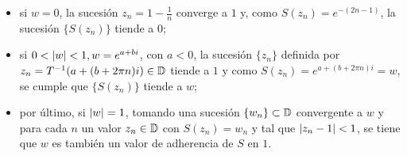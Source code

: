 \begin{itemize}
    \item si $w = 0$, la sucesión $z_n = 1 - \frac{1}{n}$ converge a $1$ y, como $S(z_n) = e^{-(2n-1)}$, la sucesión $\{S(z_n)\}$ tiende a 0;

    \item si $0 < \left\lvert w\right\rvert < 1, w = e^{a+bi}$, con $a < 0$, la sucesión $\{z_n\}$ definida por $z_n = T^{-1}(a + (b+2 \pi n)i) \in \mathbb{D}$ tiende a $1$ y como $S(z_n) = e^{a+(b+ 2 \pi n)i} = w$, se cumple que $\{S(z_n)\}$ tiende a $w$;

    \item por último, si $\left\lvert w\right\rvert = 1$, tomando una sucesión $\{w_n\} \subset \mathbb{D}$ convergente a $w$ y para cada $n$ un valor $z_n \in \mathbb{D}$ con $S(z_n) = w_n$ y tal que $\left\lvert z_n - 1\right\rvert < 1$, se tiene que $w$ es también un valor de adherencia de $S$ en $1$.
\end{itemize}

